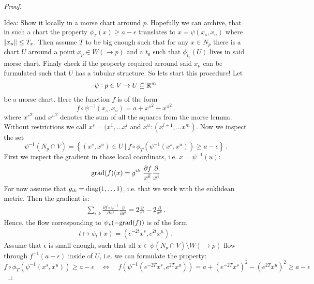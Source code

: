 \begin{proof}
\begin{center}
{\begin{tikzpicture}[x=0.75pt,y=0.75pt,yscale=-1,xscale=1]
\end{tikzpicture}


}
    \end{center}
Idea: Show it locally in a morse chart arround $p$. Hopefully we can archive, that in such a chart the property $\phi_T(x)\geq a-\epsilon$ translates to $x=\psi(x_s,x_u)$ where $\norm{x_u}\leq T_x$. Then assume $T$ to be big enough such that for any $x\in N_p$ there is a chart $U$ arround a point $x_p\in W(\to p)$ and a $t_0$ such that $\phi_{t_0}(U)$ lives in said morse chart. Finaly check if the property required arround said $x_p$ can be furmulated such that $U$ has a tubular structure.
So lets start this procedure! 
Let
\begin{align*}
    \psi:p\in V \to U \subseteq \R^m 
\end{align*} be a morse chart. Here the function $f$ is of the form
\begin{equation*}
    f\circ \psi^{-1} (x_s,x_u)=a+{x^s}^2-{x^u}^2\,. 
\end{equation*} where ${x^s}^2$ and ${x^u}^2$ denotes the sum of all the squares from the morse lemma. Without restrictions we call $x^s=(x^1,\dots x^l$ and $x^u:(x^{l+1},\dots x^m)$. Now we inspect the set 
\begin{equation} 
    \psi^{-1}(N_p\cap V)=\left\{(x^s,x^u)\in U~|~f\circ \phi_T(\psi^{-1}(x^s,x^ u))\geq a-\epsilon\right\} \, .
\end{equation} First we inspect the gradient in those local coordinats, i.e. $x=\psi^{-1}(u)$:
\begin{align*}
    \grad(f)(x)=g^{ik}~\frac{\partial f }{x^k}\frac{\partial}{x^i}
\end{align*} For now assume that $g_{ik}=\diag(1,\dots 1)$, i.e. that we work with the euklidean metric. Then the gradient is:
\begin{align*}
    \sum_{i,k} \frac{\partial f \circ \psi^{-1}}{\partial x^k} \frac{\partial}{\partial x^i}= 2\frac{\partial}{x^s} -2\frac{\partial}{x^u}\, .
\end{align*} Hence, the flow corresponding to $\psi_*(-\grad(f))$ is of the form
\begin{align*}
    t\mapsto \phi_t(x)=(e^{-2t}x^s,e^{2t}x^u) \, .
\end{align*} Assume that $\epsilon$ is small enough, such that all $x\in \psi(N_p\cap V)\setminus W(\to p)$ flow through $f^{-1}(a-\epsilon)$ inside of $U$, i.e. we can formulate the property:
\begin{equation}
    f\circ \phi_T(\psi^{-1}(x^s,x^ u))\geq a-\epsilon \quad \Leftrightarrow \quad f\left( \psi^{-1}(e^{-2T}x^s,e^{2T}x^u) \right)= a+{( e^{-2T}x^s)}^2-(e^{2T}x^u)^2  \geq a-\epsilon

\end{equation}
\end{proof}
